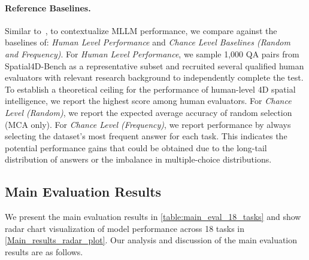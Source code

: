 \paragraph{Reference Baselines.}
Similar to~\cite{Yang_2025_CVPR}, to contextualize MLLM performance, we compare against the baselines of: \textit{Human Level Performance} and \textit{Chance Level Baselines (Random and Frequency)}. 
For \textit{Human Level Performance}, we sample 1,000 QA pairs from Spatial4D-Bench as a representative subset and recruited several qualified human evaluators with relevant research background to independently complete the test.
To establish a theoretical ceiling for the performance of human-level 4D spatial intelligence, we report the highest score among human evaluators. 
For \textit{Chance Level (Random)}, we report the expected average accuracy of random selection (MCA only).
For \textit{Chance Level (Frequency)}, we report performance by always selecting the dataset's most frequent answer for each task. This indicates the potential performance gains that could be obtained due to the long-tail distribution of answers or the imbalance in multiple-choice distributions.







\subsection{Main Evaluation Results}
\label{sec:main_results}
We present the main evaluation results in \cref{table:main_eval_18_tasks} and show radar chart visualization of model performance across 18 tasks in \cref{Main_results_radar_plot}.
Our analysis and discussion of the main evaluation results are as follows.


